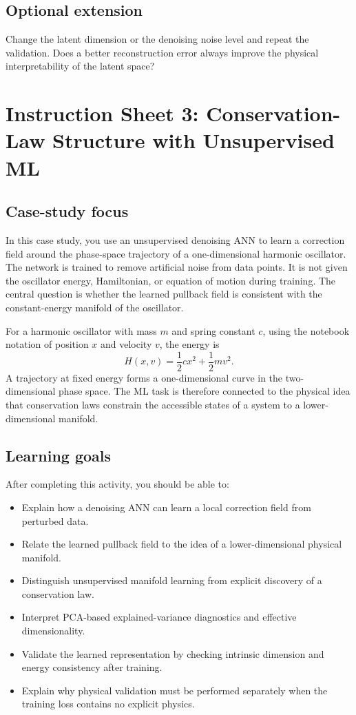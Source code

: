 \documentclass[11pt]{article}
\begin{document}
\subsection*{Optional extension}
Change the latent dimension or the denoising noise level and repeat the validation. Does a better reconstruction error always improve the physical interpretability of the latent space?

\section*{Instruction Sheet 3: Conservation-Law Structure with Unsupervised ML}

\subsection*{Case-study focus}
In this case study, you use an unsupervised denoising ANN to learn a correction field around the phase-space trajectory of a one-dimensional harmonic oscillator. The network is trained to remove artificial noise from data points. It is not given the oscillator energy, Hamiltonian, or equation of motion during training. The central question is whether the learned pullback field is consistent with the constant-energy manifold of the oscillator.

For a harmonic oscillator with mass \(m\) and spring constant \(c\), using the notebook notation of position \(x\) and velocity \(v\), the energy is
\[
H(x,v)=\frac{1}{2}cx^2+\frac{1}{2}mv^2.
\]
A trajectory at fixed energy forms a one-dimensional curve in the two-dimensional phase space. The ML task is therefore connected to the physical idea that conservation laws constrain the accessible states of a system to a lower-dimensional manifold.

\subsection*{Learning goals}
After completing this activity, you should be able to:
\begin{itemize}
    \item Explain how a denoising ANN can learn a local correction field from perturbed data.
    \item Relate the learned pullback field to the idea of a lower-dimensional physical manifold.
    \item Distinguish unsupervised manifold learning from explicit discovery of a conservation law.
    \item Interpret PCA-based explained-variance diagnostics and effective dimensionality.
    \item Validate the learned representation by checking intrinsic dimension and energy consistency after training.
    \item Explain why physical validation must be performed separately when the training loss contains no explicit physics.
\end{itemize}
\end{document}
